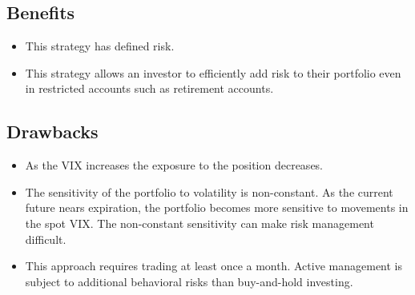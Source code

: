 \documentclass[11pt, oneside]{book}
\begin{document}
\subsection{Benefits} \label{Investing-VIXPut-Benefit}
\begin{itemize}
    \item This strategy has defined risk.
    \item This strategy allows an investor to efficiently add risk to their portfolio even in restricted accounts such as retirement accounts.
\end{itemize}

\subsection{Drawbacks} \label{Investing-VIXPut-Drawbacks}
\begin{itemize}
    \item As the VIX increases the exposure to the position decreases.
    \item The sensitivity of the portfolio to volatility is non-constant. As the current future nears expiration, the portfolio becomes more sensitive to movements in the spot VIX. The non-constant sensitivity can make risk management difficult.
    \item This approach requires trading at least once a month. Active management is subject to additional behavioral risks than buy-and-hold investing.
\end{itemize}
\end{document}
